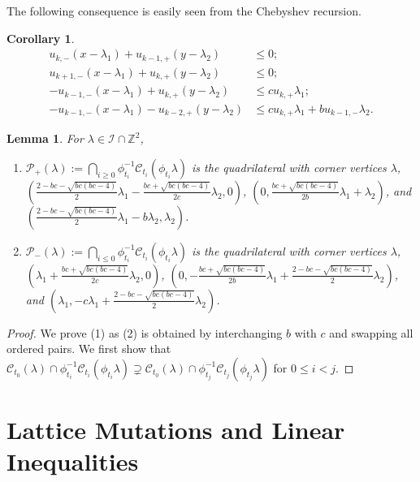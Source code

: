 \documentclass{amsart}
\newtheorem{corollary}[theorem]{Corollary}
\newtheorem{lemma}[theorem]{Lemma}
\numberwithin{theorem}{section}
\newcommand{\cC}{\mathcal{C}}
\newcommand{\cI}{\mathcal{I}}
\newcommand{\cP}{\mathcal{P}}
\newcommand{\ZZ}{\mathbb{Z}}
\begin{document}
  The following consequence is easily seen from the Chebyshev recursion.
  \begin{corollary}
    \begin{align*}
      u_{k,-}(x-\lambda_1)+u_{k-1,+}(y-\lambda_2) &\le 0;\\
      u_{k+1,-}(x-\lambda_1)+u_{k,+}(y-\lambda_2) &\le 0;\\
      -u_{k-1,-}(x-\lambda_1)+u_{k,+}(y-\lambda_2) &\le cu_{k,+}\lambda_1;\\
      -u_{k-1,-}(x-\lambda_1)-u_{k-2,+}(y-\lambda_2) &\le cu_{k,+}\lambda_1+bu_{k-1,-}\lambda_2.
    \end{align*}
  \end{corollary}

  \begin{lemma}
    \label{le:one direction}
    For $\lambda\in\cI\cap\ZZ^2$, 
    \begin{enumerate}
      \item $\cP_+(\lambda):=\bigcap_{i \ge 0}\phi_{t_i}^{-1}\cC_{t_i}(\phi_{t_i}\lambda)$ is the quadrilateral with corner vertices $\lambda$, $(\frac{2-bc-\sqrt{bc(bc-4)}}{2}\lambda_1-\frac{bc+\sqrt{bc(bc-4)}}{2c}\lambda_2,0)$, $(0,\frac{bc+\sqrt{bc(bc-4)}}{2b}\lambda_1+\lambda_2)$, and $(\frac{2-bc-\sqrt{bc(bc-4)}}{2}\lambda_1-b\lambda_2,\lambda_2)$.
      \item $\cP_-(\lambda):=\bigcap_{i \le 0}\phi_{t_i}^{-1}\cC_{t_i}(\phi_{t_i}\lambda)$ is the quadrilateral with corner vertices $\lambda$, $(\lambda_1+\frac{bc+\sqrt{bc(bc-4)}}{2c}\lambda_2,0)$, $(0,-\frac{bc+\sqrt{bc(bc-4)}}{2b}\lambda_1+\frac{2-bc-\sqrt{bc(bc-4)}}{2}\lambda_2)$, and $(\lambda_1,-c\lambda_1+\frac{2-bc-\sqrt{bc(bc-4)}}{2}\lambda_2)$.
    \end{enumerate}
  \end{lemma}
  \begin{proof}
    We prove (1) as (2) is obtained by interchanging $b$ with $c$ and swapping all ordered pairs.  
    We first show that $\cC_{t_0}(\lambda) \cap \phi_{t_i}^{-1}\cC_{t_i}(\phi_{t_i}\lambda)\supsetneq \cC_{t_0}(\lambda) \cap \phi_{t_j}^{-1}\cC_{t_j}(\phi_{t_j}\lambda)$ for $0\le i<j$.
  \end{proof}



\section{Lattice Mutations and Linear Inequalities}
\end{document}
